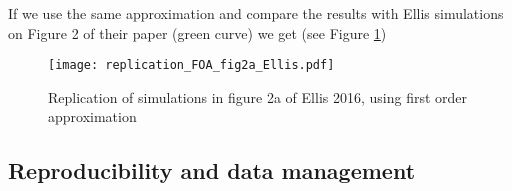 If we use the same approximation and compare the results with Ellis simulations on
Figure 2 of their paper (green curve) we get (see Figure \ref{fig:rep_2a})

\begin{figure}
    \centering
    \texttt{[image: replication\_FOA\_fig2a\_Ellis.pdf]} 
    \caption{Replication of simulations in figure 2a of Ellis 2016, using first
     order approximation}
    \label{fig:rep_2a}
 \end{figure}
 
 
 \subsection{Reproducibility and data management} \label{sec:reprod}